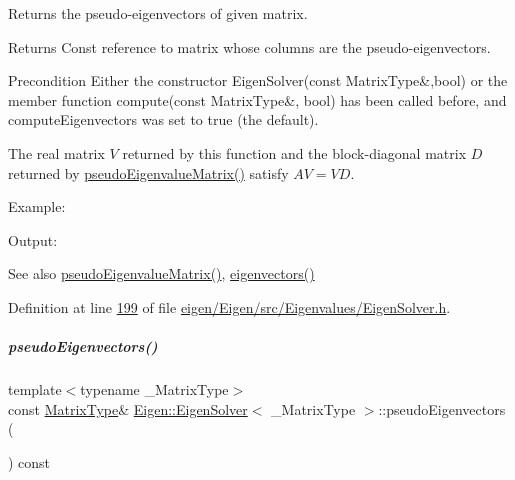 Returns the pseudo-\/eigenvectors of given matrix. 

\begin{DoxyReturn}{Returns}
Const reference to matrix whose columns are the pseudo-\/eigenvectors.
\end{DoxyReturn}
\begin{DoxyPrecond}{Precondition}
Either the constructor Eigen\+Solver(const Matrix\+Type\&,bool) or the member function compute(const Matrix\+Type\&, bool) has been called before, and {\ttfamily compute\+Eigenvectors} was set to true (the default).
\end{DoxyPrecond}
The real matrix $ V $ returned by this function and the block-\/diagonal matrix $ D $ returned by \hyperlink{group___eigenvalues___module_a4979eafe0aeef06b19ada7fa5e19db17}{pseudo\+Eigenvalue\+Matrix()} satisfy $ AV = VD $.

Example\+: 
\begin{DoxyCodeInclude}
\end{DoxyCodeInclude}
 Output\+: 
\begin{DoxyVerbInclude}
\end{DoxyVerbInclude}


\begin{DoxySeeAlso}{See also}
\hyperlink{group___eigenvalues___module_a4979eafe0aeef06b19ada7fa5e19db17}{pseudo\+Eigenvalue\+Matrix()}, \hyperlink{group___eigenvalues___module_a66288022802172e3ee059283b26201d7}{eigenvectors()} 
\end{DoxySeeAlso}


Definition at line \hyperlink{eigen_2_eigen_2src_2_eigenvalues_2_eigen_solver_8h_source_l00199}{199} of file \hyperlink{eigen_2_eigen_2src_2_eigenvalues_2_eigen_solver_8h_source}{eigen/\+Eigen/src/\+Eigenvalues/\+Eigen\+Solver.\+h}.

\mbox{\label{group___eigenvalues___module_a4e796226f06e1f7347cf03a38755a155}} 
\subparagraph{\texorpdfstring{pseudo\+Eigenvectors()}{pseudoEigenvectors()}\hspace{0.1cm}{\footnotesize\ttfamily [2/2]}}
{\footnotesize\ttfamily template$<$typename \+\_\+\+Matrix\+Type$>$ \\
const \hyperlink{group___eigenvalues___module_a83acd180404ddaac8a678fa65a6b632b}{Matrix\+Type}\& \hyperlink{group___eigenvalues___module_class_eigen_1_1_eigen_solver}{Eigen\+::\+Eigen\+Solver}$<$ \+\_\+\+Matrix\+Type $>$\+::pseudo\+Eigenvectors (\begin{DoxyParamCaption}{ }\end{DoxyParamCaption}) const\hspace{0.3cm}{\ttfamily [inline]}}



